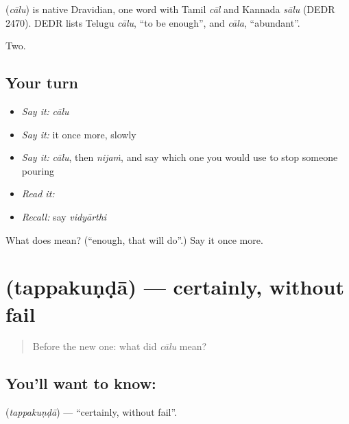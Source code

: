 \begin{cousinweb}
\textbf{} (\emph{cālu}) is native Dravidian, one word with Tamil \emph{cāl} and Kannada \emph{sālu} (DEDR 2470). DEDR lists Telugu \emph{cālu}, \textquotedblleft{}to be enough\textquotedblright{}, and \emph{cāla}, \textquotedblleft{}abundant\textquotedblright{}.
\end{cousinweb}

\begin{grammarlens}[title={What you've built}]
Two.
\end{grammarlens}

\subsection*{Your turn}
\begin{itemize}
\raggedright
  \item \emph{Say it:} \emph{cālu}
  \item \emph{Say it:} it once more, slowly
  \item \emph{Say it:} \emph{cālu}, then \emph{nijaṁ}, and say which one you would use to stop someone pouring
  \item \emph{Read it:} \textbf{}
  \item \emph{Recall:} say \emph{vidyārthi}
\end{itemize}

\begin{tcolorbox}[breakable,colback=teal!4,colframe=teal!35!black,title={Before you move on}]
What does  mean? (\textquotedblleft{}enough, that will do\textquotedblright{}.) Say it once more.
\end{tcolorbox}
\section[\texorpdfstring{\te{తప్పకుండా} (tappakuṇḍā)}{తప్పకుండా (tappakuṇḍā)}]{ (tappakuṇḍā) — certainly, without fail}

\label{lesson:TE-C49-certainly}



\begin{quote}
Before the new one: what did \emph{cālu} mean?
\end{quote}

\subsection*{You'll want to know: }
\textbf{} (\emph{tappakuṇḍā}) — \textquotedblleft{}certainly, without fail\textquotedblright{}.

